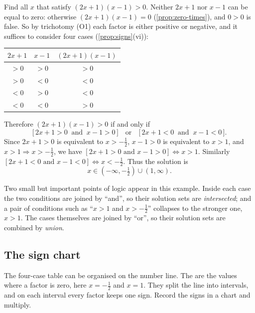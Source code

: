 \begin{example}
Find all $x$ that satisfy $(2x+1)(x-1)>0$. 
\solution
Neither $2x+1$ nor $x-1$ can be equal to zero: otherwise $(2x+1)(x-1)=0$ (\cref{prop:zero-times}), and $0>0$
is false. So by trichotomy (O1) each factor is either positive or negative, and it suffices to consider four
cases (\cref{prop:signs}(vi)):
\begin{center}
\begin{tabular}{ccc}
\toprule
$2x+1$ & $x-1$ & $(2x+1)(x-1)$\\
\midrule
$>0$ & $>0$ & $>0$\\
$>0$ & $<0$ & $<0$\\
$<0$ & $>0$ & $<0$\\
$<0$ & $<0$ & $>0$\\
\bottomrule
\end{tabular}
\end{center}
Therefore $(2x+1)(x-1)>0$ if and only if
\[
\big[\,2x+1>0\ \text{ and }\ x-1>0\,\big]\quad\text{or}\quad\big[\,2x+1<0\ \text{ and }\ x-1<0\,\big].
\]
Since $2x+1>0$ is equivalent to $x>-\tfrac12$, $x-1>0$ is equivalent to $x>1$, and $x>1\Rightarrow x>-\tfrac12$,
we have $[2x+1>0\text{ and }x-1>0]\Leftrightarrow x>1$. Similarly $[2x+1<0\text{ and }x-1<0]\Leftrightarrow x<-\tfrac12$.
Thus the solution is
\[
x\in(-\infty,-\tfrac12)\cup(1,\infty).
\]
\end{example}

Two small but important points of logic appear in this example. Inside each case the two conditions are joined
by ``and'', so their solution sets are \emph{intersected}; and a pair of conditions such as ``$x>1$ and
$x>-\tfrac12$'' collapses to the stronger one, $x>1$. The cases themselves are joined by ``or'', so their
solution sets are combined by \emph{union}.

\subsection{The sign chart}

The four-case table can be organised on the number line. The  are the values where a
factor is zero, here $x=-\tfrac12$ and $x=1$. They split the line into intervals, and on each interval every
factor keeps one sign. Record the signs in a chart and multiply.

